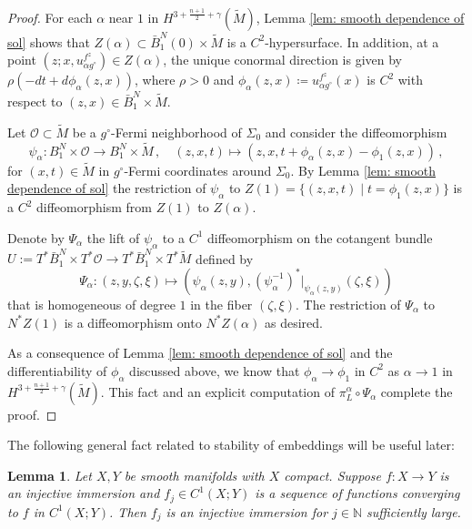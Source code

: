 \documentclass[11pt]{amsart}
\newtheorem{Lemma}[Theorem]{Lemma}
\theoremstyle{definition}
\numberwithin{equation}{section}
\begin{document}
\begin{proof}
For each $\alpha$ near $1$ in $H^{3+\frac{n+1}{2}+\gamma}(\widetilde{M})$, Lemma \ref{lem: smooth dependence of sol} shows that $Z(\alpha)\subset \bar{B}_{1}^{N}(0) \times \widetilde{M}$ is a $C^2$-hypersurface. In addition, at a point $(z;x, u_{\alpha g^\circ}^{f^z})\in Z(\alpha)$, the unique conormal direction is given by $\rho\left(-dt + d\phi_\alpha(z,x)\right)$, where $\rho>0$ and $\phi_\alpha(z,x) \coloneqq u_{\alpha g^\circ}^{f^z}(x)$ is $C^2$ with respect to $(z,x)\in \bar{B}_1^{N}\times \widetilde{M}$. %

Let $\mathcal O \subset  \widetilde{M}$ be a $g^\circ$-Fermi neighborhood of $\Sigma_0$ and consider the diffeomorphism 
\[
	\psi_\alpha\colon B^{N}_1\times \mathcal O\to  B^{N}_1 \times \widetilde{M}\,, \quad (z,x,t) \mapsto (z, x, t+\phi_{\alpha}(z,x) - \phi_{1}(z,x))\,,
\] 
for $(x,t) \in \widetilde{M}$ in $g^\circ$-Fermi coordinates around $\Sigma_0$. By Lemma \ref{lem: smooth dependence of sol} the restriction of $\psi_\alpha$ to $Z(1) = \{(z,x,t)\mid t=\phi_1(z,x)\}$ is a $C^2$ diffeomorphism from $Z(1)$ to $Z(\alpha)$.

Denote by $\Psi_\alpha$ the lift of $\psi_\alpha$ to a $C^1$ diffeomorphism on the cotangent bundle $U:=T^*\bar{B}^{N}_1 \times T^*\mathcal O \to T^*\bar{B}^{N}_1 \times T^*\widetilde{M}$ defined by
$$\Psi_\alpha \colon (z,y, \zeta,\xi) \mapsto \left(\psi_\alpha(z,y), \left(\psi_\alpha^{-1}\right)^*\vert_{\psi_\alpha(z,y)}(\zeta,\xi)\right)$$
that is homogeneous of degree $1$ in the fiber $(\zeta,\xi)$. The restriction of $\Psi_\alpha$ to $N^*Z(1)$ is a diffeomorphism onto $N^*Z(\alpha)$ as desired. %

As a consequence of Lemma \ref{lem: smooth dependence of sol} and the differentiability of $\phi_\alpha$ discussed above, we know that $\phi_\alpha\to \phi_1$ in $C^2$ as $\alpha\to 1$ in $H^{3+\frac{n+1}{2}+\gamma}(\widetilde{M})$. This fact and an explicit computation of $\pi_L^\alpha \circ \Psi_\alpha$ complete the proof.
\end{proof}
The following general fact related to stability of embeddings \cite[Prop.~4.33]{MR4328926} will be useful later:
\begin{Lemma}
    \label{lem: general openness of inj imm}
Let $X, Y$ be smooth manifolds with $X$ compact. Suppose $f:  X \to Y$ is an injective immersion and $f_j \in C^1(X ; Y)$ is a sequence of functions converging to $f$ in $C^1( X; Y)$. Then $f_j$ is an injective immersion for $j\in \mathbb N$ sufficiently large.
\end{Lemma}
\end{document}
